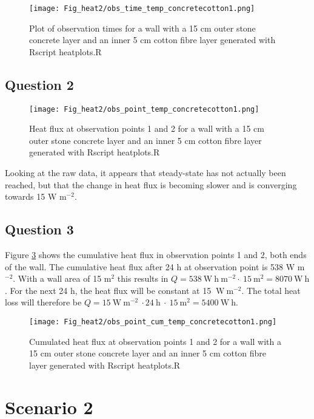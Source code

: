 \begin{figure}[!h]
\centering
\texttt{[image: Fig\_heat2/obs\_time\_temp\_concretecotton1.png]}
\caption{\label{plot1h}Plot of observation times for a wall with a 15 cm outer stone concrete layer and an inner 5 cm cotton fibre layer  generated with Rscript heatplots.R}
\end{figure}

\subsection*{Question 2}

\begin{figure}[!h]
\centering
\texttt{[image: Fig\_heat2/obs\_point\_temp\_concretecotton1.png]}
\caption{\label{plot2h} Heat flux at observation points 1 and 2 for a wall with a 15 cm outer stone concrete layer and an inner 5 cm cotton fibre layer generated with Rscript heatplots.R}
\end{figure}

Looking at the raw data, it appears that steady-state has not actually been reached, but that the change in heat flux is becoming slower and is converging towards 15 W m$^{-2}$. 

\newpage
\subsection*{Question 3}

Figure \ref{plot3h} shows the cumulative heat flux in observation points 1 and 2, both ends of the wall. The cumulative heat flux after 24 h at observation point is 538 W m$^{-2}$. With a wall area of 15 m$^2$ this results in $Q = 538~\mathrm{W~h~m^{-2}}\cdot~15~\mathrm{m^{2}}= 8070 ~\mathrm{W~h}$. 
For the next 24 h, the heat flux will be constant at 15 $\mathrm{~W~m^{-2}}$. The total heat loss will therefore be $Q=15 \mathrm{~W~m^{-2}}~\cdot 24~\mathrm{h}~\cdot~15~\mathrm{m^{2}}=5400 \mathrm{~W~h}$.

\begin{figure}[!h]
\centering
\texttt{[image: Fig\_heat2/obs\_point\_cum\_temp\_concretecotton1.png]}
\caption{\label{plot3h} Cumulated heat flux at observation points 1 and 2 for a wall with a 15 cm outer stone concrete layer and an inner 5 cm cotton fibre layer generated with Rscript heatplots.R}
\end{figure}

\newpage

\section*{Scenario 2}

